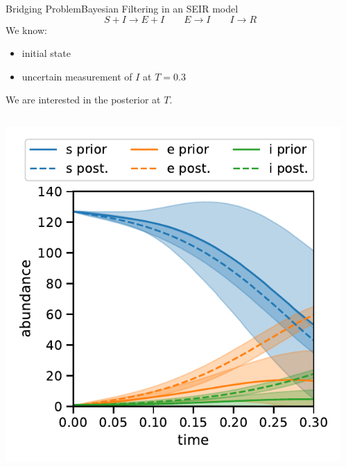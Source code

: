 \documentclass[10pt]{beamer}
\begin{document}
\begin{frame}{Bridging Problem}{Bayesian Filtering in an SEIR model}
    \[ S+I \rightarrow E+I \qquad E\rightarrow I \qquad I\rightarrow R \]
    We know:
    \begin{itemize}
        \item initial state
        \item uncertain measurement of $I$ at $T=0.3$
    \end{itemize}
    We are interested in the posterior at $T$.
    \begin{columns}
        \begin{column}{.35\paperwidth}
            \includegraphics[width=\textwidth]{../gfx/seir_prior_posterior.pdf}
        \end{column}
        \begin{column}{.35\paperwidth}

\end{column}
\end{columns}
\end{frame}
\end{document}
